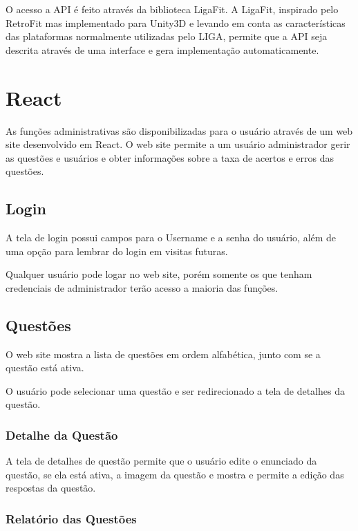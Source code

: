 O acesso a API é feito através da biblioteca LigaFit. A LigaFit, inspirado pelo RetroFit mas implementado para Unity3D e levando em conta as características das plataformas normalmente utilizadas pelo LIGA, permite que a API seja descrita através de uma interface e gera implementação automaticamente.


\section{React}
\label{sec:react}
As funções administrativas são disponibilizadas para o usuário através de um web site desenvolvido em React. O web site permite a um usuário administrador gerir as questões e usuários e obter informações sobre a taxa de acertos e erros das questões. 

\subsection{Login}
\label{subsec:loginreact}

A tela de login possui campos para o Username e a senha do usuário, além de uma opção para lembrar do login em visitas futuras.

Qualquer usuário pode logar no web site, porém somente os que tenham credenciais de administrador terão acesso a maioria das funções.


\subsection{Questões}
\label{subsec:questoesreact}

O web site  mostra a lista de questões em ordem alfabética, junto com se a questão está ativa.
    
O usuário pode selecionar uma questão e ser redirecionado a tela de detalhes da questão.


\subsubsection{Detalhe da Questão}
\label{subsubsec:detalhequestao}

A tela de detalhes de questão permite que o usuário edite o enunciado da questão, se ela está ativa, a imagem da questão e mostra e permite a edição das respostas da questão.


\subsubsection{Relatório das Questões}
\label{subsubsec:relatorioquestoes}

